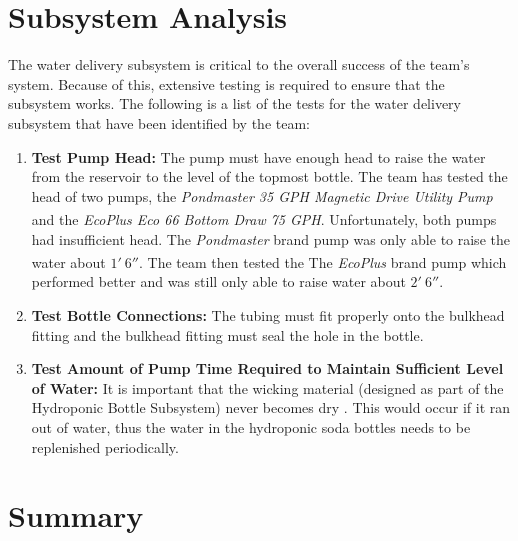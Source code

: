 \documentclass[12pt]{article}
\let\supscr=\textsuperscript
\begin{document}
\section{Subsystem Analysis}


The water delivery subsystem is critical to the overall success of the team's system. Because of
this, extensive testing is required to ensure that the subsystem works. The following is a list of
the tests for the water delivery subsystem that have been identified by the team:

\begin{enumerate}

    \item \textbf{Test Pump Head:} The pump must have enough head to raise the water from the
        reservoir to the level of the topmost bottle. The team has tested the head of two pumps, the
        \textit{Pondmaster 35 GPH Magnetic Drive Utility Pump} and the
        \textit{EcoPlus\supscr{\textregistered} Eco 66 Bottom Draw 75 GPH}. Unfortunately, both
        pumps had insufficient head. The \textit{Pondmaster} brand pump was only able to raise the
        water about $1'\ 6''$. The team then tested the The \textit{EcoPlus\supscr{\textregistered}}
        brand pump which performed better and was still only able to raise water about $2'\ 6''$.

    \item \textbf{Test Bottle Connections:} The tubing must fit properly onto the bulkhead fitting
        and the bulkhead fitting must seal the hole in the bottle.

    \item \textbf{Test Amount of Pump Time Required to Maintain Sufficient Level of Water:} It is
        important that the wicking material (designed as part of the Hydroponic Bottle Subsystem)
        never becomes dry \cite{kaiser-and-erns}. This would occur if it ran out of water, thus the
        water in the hydroponic soda bottles needs to be replenished periodically.

\end{enumerate}

\section{Summary}
\end{document}
